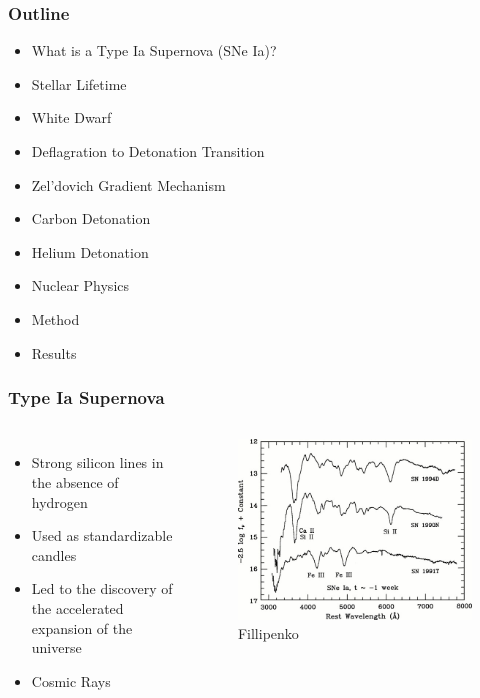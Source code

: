 \documentclass{beamer}
\begin{document}

\begin{frame}
	\frametitle{Outline}
	\begin{itemize}
		\item What is a Type Ia Supernova (SNe Ia)?
		\item Stellar Lifetime
		\item White Dwarf
		\item Deflagration to Detonation Transition
		\item Zel'dovich Gradient Mechanism
		\item Carbon Detonation
		\item Helium Detonation
		\item Nuclear Physics
		\item Method
		\item Results
	\end{itemize}
\end{frame}





\begin{frame}
\frametitle{Type Ia Supernova}

\begin{columns}[c]
	\begin{itemize}
		\item Strong silicon lines in the absence of hydrogen
		\item Used as standardizable candles
		\item Led to the discovery of the accelerated expansion of the universe
		\item Cosmic Rays
	\end{itemize}


        \begin{figure}
    \begin{center}
      \includegraphics[width=.90\linewidth]{spectrum.jpg}
	    \caption{Fillipenko}
    \end{center}
  \end{figure}

        \end{columns}

\end{frame}
\end{document}
